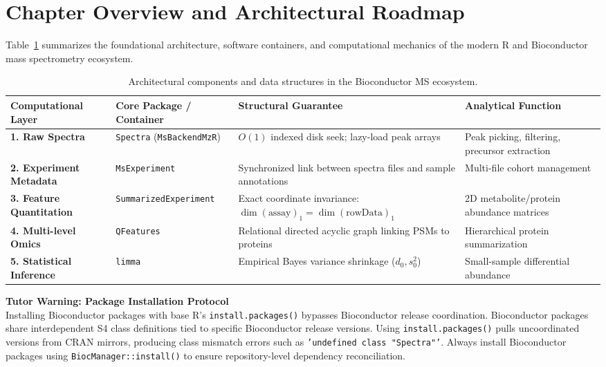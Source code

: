 \documentclass[11pt,twoside,openright]{book}
\begin{document}
\section*{Chapter Overview and Architectural Roadmap}

Table~\ref{tab:r_bioc_roadmap} summarizes the foundational architecture, software containers, and computational mechanics of the modern R and Bioconductor mass spectrometry ecosystem.

\begin{table}[htbp]
\centering
\caption{Architectural components and data structures in the Bioconductor MS ecosystem.}
\label{tab:r_bioc_roadmap}
\small
\begin{tabularx}{\textwidth}{>{\raggedright\arraybackslash}l >{\raggedright\arraybackslash}p{4.2cm} >{\raggedright\arraybackslash}X >{\raggedright\arraybackslash}p{2.8cm}}
\toprule
\textbf{Computational Layer} & \textbf{Core Package / Container} & \textbf{Structural Guarantee} & \textbf{Analytical Function} \\
\midrule
\textbf{1. Raw Spectra} & \texttt{Spectra} (\texttt{MsBackendMzR}) \cite{rainer2022spectra, gatto2021msnbase} & $O(1)$ indexed disk seek; lazy-load peak arrays & Peak picking, filtering, precursor extraction \\
\addlinespace
\textbf{2. Experiment Metadata} & \texttt{MsExperiment} \cite{rainer2022spectra} & Synchronized link between spectra files and sample annotations & Multi-file cohort management \\
\addlinespace
\textbf{3. Feature Quantitation} & \texttt{SummarizedExperiment} \cite{huber2015orchestrating} & Exact coordinate invariance: $\dim(\text{assay})_1 = \dim(\text{rowData})_1$ & 2D metabolite/protein abundance matrices \\
\addlinespace
\textbf{4. Multi-level Omics} & \texttt{QFeatures} \cite{gatto2023qfeatures, vanderaa2021scp} & Relational directed acyclic graph linking PSMs to proteins & Hierarchical protein summarization \\
\addlinespace
\textbf{5. Statistical Inference} & \texttt{limma} \cite{smyth2004linear, ritchie2015limma} & Empirical Bayes variance shrinkage ($d_0, s_0^2$) & Small-sample differential abundance \\
\bottomrule
\end{tabularx}
\end{table}

\begin{notebox}
\textbf{Tutor Warning: Package Installation Protocol}\\[0.4em]
Installing Bioconductor packages with base R's \texttt{install.packages()} bypasses Bioconductor release coordination. Bioconductor packages share interdependent S4 class definitions tied to specific Bioconductor release versions. Using \texttt{install.packages()} pulls uncoordinated versions from CRAN mirrors, producing class mismatch errors such as \texttt{'undefined class "Spectra"'}. Always install Bioconductor packages using \texttt{BiocManager::install()} to ensure repository-level dependency reconciliation.
\end{notebox}
\end{document}
